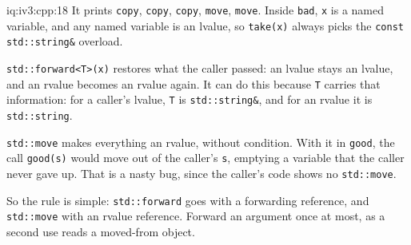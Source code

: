\begin{solution}{iq:iv3:cpp:18}
It prints \texttt{copy}, \texttt{copy}, \texttt{copy}, \texttt{move}, \texttt{move}. Inside \texttt{bad}, \texttt{x} is a named variable, and any named variable is an lvalue, so \texttt{take(x)} always picks the \texttt{const std::string\&} overload.

\texttt{std::forward<T>(x)} restores what the caller passed: an lvalue stays an lvalue, and an rvalue becomes an rvalue again. It can do this because \texttt{T} carries that information: for a caller's lvalue, \texttt{T} is \texttt{std::string\&}, and for an rvalue it is \texttt{std::string}.

\texttt{std::move} makes everything an rvalue, without condition. With it in \texttt{good}, the call \texttt{good(s)} would move out of the caller's \texttt{s}, emptying a variable that the caller never gave up. That is a nasty bug, since the caller's code shows no \texttt{std::move}.

So the rule is simple: \texttt{std::forward} goes with a forwarding reference, and \texttt{std::move} with an rvalue reference. Forward an argument once at most, as a second use reads a moved-from object.

\end{solution}

